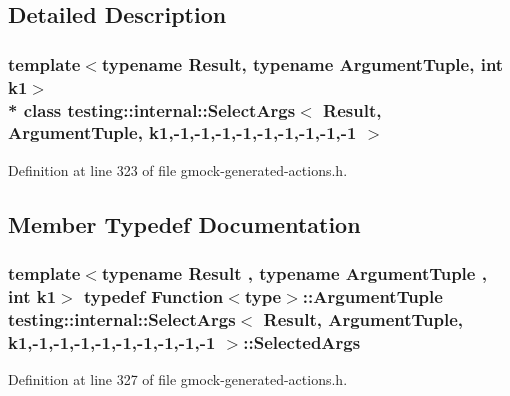\subsection{Detailed Description}
\subsubsection*{template$<$typename Result, typename Argument\+Tuple, int k1$>$\\*
class testing\+::internal\+::\+Select\+Args$<$ Result, Argument\+Tuple, k1,-\/1,-\/1,-\/1,-\/1,-\/1,-\/1,-\/1,-\/1,-\/1 $>$}



Definition at line 323 of file gmock-\/generated-\/actions.\+h.



\subsection{Member Typedef Documentation}
\subsubsection[{\texorpdfstring{Selected\+Args}{SelectedArgs}}]{\setlength{\rightskip}{0pt plus 5cm}template$<$typename Result , typename Argument\+Tuple , int k1$>$ typedef {\bf Function}$<${\bf type}$>$\+::{\bf Argument\+Tuple} {\bf testing\+::internal\+::\+Select\+Args}$<$ {\bf Result}, {\bf Argument\+Tuple}, k1,-\/1,-\/1,-\/1,-\/1,-\/1,-\/1,-\/1,-\/1,-\/1 $>$\+::{\bf Selected\+Args}}\hypertarget{classtesting_1_1internal_1_1_select_args_3_01_result_00_01_argument_tuple_00_01k1_00-1_00-1_00-16ae4dde9341810fff5dd4b06d1d121a8_a11dba88063a9b50ec965a42b1f6892c9}{}\label{classtesting_1_1internal_1_1_select_args_3_01_result_00_01_argument_tuple_00_01k1_00-1_00-1_00-16ae4dde9341810fff5dd4b06d1d121a8_a11dba88063a9b50ec965a42b1f6892c9}


Definition at line 327 of file gmock-\/generated-\/actions.\+h.

